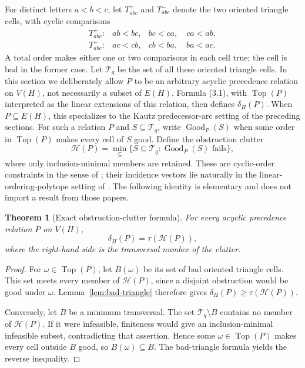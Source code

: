 \documentclass[11pt,a4paper]{article}
\newtheorem{theorem}{Theorem}[section]
\theoremstyle{remark}
\newcommand{\Top}{\operatorname{Top}}
\begin{document}
For distinct letters \(a<b<c\), let \(T^+_{abc}\) and \(T^-_{abc}\) denote
the two oriented triangle cells, with cyclic comparisons
\[
 \begin{array}{lll}
 T^+_{abc}:&ab<bc,&bc<ca,\quad ca<ab,\\
 T^-_{abc}:&ac<cb,&cb<ba,\quad ba<ac.
 \end{array}
\]
A total order makes either one or two comparisons in each cell true; the cell
is bad in the former case.  Let \(\mathcal T_q\) be the set of all these
oriented triangle cells.  In this section we deliberately allow \(P\) to be
an arbitrary acyclic precedence relation on \(V(H)\), not necessarily a
subset of \(E(H)\).  Formula (3.1), with \(\Top(P)\) interpreted as the linear
extensions of this relation, then defines \(\delta_H(P)\).  When
\(P\subseteq E(H)\), this specializes to the Kautz predecessor-arc setting of
the preceding sections.  For such a relation \(P\) and
\(S\subseteq\mathcal T_q\), write \(\operatorname{Good}_P(S)\) when some
order in \(\Top(P)\) makes every cell of \(S\) good.  Define the obstruction
clutter
\[
 \mathcal H(P)=\min_{\subseteq}
 \{S\subseteq\mathcal T_q:\operatorname{Good}_P(S)\text{ fails}\},
                                                               \tag{10.1}
\]
where only inclusion-minimal members are retained.  These are cyclic-order
constraints in the sense of \cite{GalilMegiddo1977,Opatrny1979}; their
incidence vectors lie naturally in the linear-ordering-polytope setting of
\cite{GroetschelJuengerReinelt1985}.  The following identity is elementary
and does not import a result from those papers.

\begin{theorem}[Exact obstruction-clutter formula]
\label{thm:obstruction-clutter}
For every acyclic precedence relation \(P\) on \(V(H)\),
\[
 \delta_H(P)=\tau(\mathcal H(P)),                         \tag{10.2}
\]
where the right-hand side is the transversal number of the clutter.
\end{theorem}

\begin{proof}
For \(\omega\in\Top(P)\), let \(B(\omega)\) be its set of bad oriented
triangle cells.  This set meets every member of \(\mathcal H(P)\), since a
disjoint obstruction would be good under \(\omega\).  Lemma~\ref{lem:bad-triangle}
therefore gives \(\delta_H(P)\geq\tau(\mathcal H(P))\).

Conversely, let \(B\) be a minimum transversal.  The set
\(\mathcal T_q\setminus B\) contains no member of \(\mathcal H(P)\).  If it
were infeasible, finiteness would give an inclusion-minimal infeasible subset,
contradicting that assertion.  Hence some \(\omega\in\Top(P)\) makes every
cell outside \(B\) good, so \(B(\omega)\subseteq B\).  The bad-triangle
formula yields the reverse inequality.
\end{proof}
\end{document}
